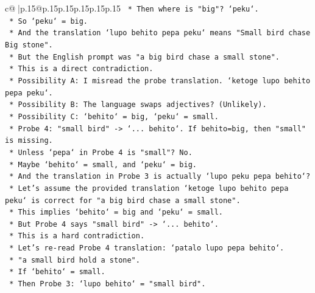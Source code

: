 \documentclass{article}
\begin{document}
{\begin{supertabular}{c@{$\;$}|p{.15\linewidth}@{}p{.15\linewidth}p{.15\linewidth}p{.15\linewidth}p{.15\linewidth}p{.15\linewidth}}
{{{\texttt{                        *   Then where is "big"? `peku`.} \\
\texttt{                        *   So `peku` = big.} \\
\texttt{                        *   And the translation `lupo behito pepa peku` means "Small bird chase Big stone".} \\
\texttt{                        *   But the English prompt was "a big bird chase a small stone".} \\
\texttt{                        *   This is a direct contradiction.} \\
\texttt{                        *   Possibility A: I misread the probe translation. `ketoge lupo behito pepa peku`.} \\
\texttt{                        *   Possibility B: The language swaps adjectives? (Unlikely).} \\
\texttt{                        *   Possibility C: `behito` = big, `peku` = small.} \\
\texttt{                            *   Probe 4: "small bird" {-}> `... behito`. If behito=big, then "small" is missing.} \\
\texttt{                            *   Unless `pepa` in Probe 4 is "small"? No.} \\
\texttt{                            *   Maybe `behito` = small, and `peku` = big.} \\
\texttt{                            *   And the translation in Probe 3 is actually `lupo peku pepa behito`?} \\
\texttt{                            *   Let's assume the provided translation `ketoge lupo behito pepa peku` is correct for "a big bird chase a small stone".} \\
\texttt{                            *   This implies `behito` = big and `peku` = small.} \\
\texttt{                            *   But Probe 4 says "small bird" {-}> `... behito`.} \\
\texttt{                            *   This is a hard contradiction.} \\
\texttt{                            *   Let's re{-}read Probe 4 translation: `patalo lupo pepa behito`.} \\
\texttt{                            *   "a small bird hold a stone".} \\
\texttt{                            *   If `behito` = small.} \\
\texttt{                            *   Then Probe 3: `lupo behito` = "small bird".} \\
}}}
\end{supertabular}}
\end{document}
